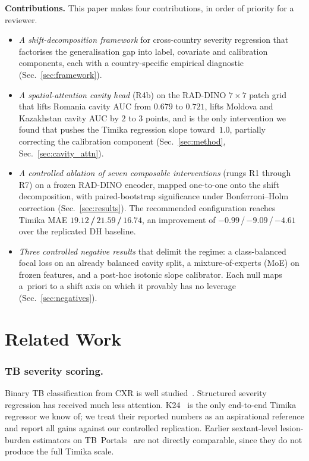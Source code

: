 \documentclass[runningheads]{llncs}
\begin{document}
\smallskip\noindent\textbf{Contributions.}
This paper makes four contributions, in order of priority for a reviewer.
\begin{itemize}
\item \emph{A shift-decomposition framework} for cross-country severity regression that factorises the generalisation gap into label, covariate and calibration components, each with a country-specific empirical diagnostic (Sec.~\ref{sec:framework}).
\item \emph{A spatial-attention cavity head} (R4b) on the RAD-DINO $7\!\times\!7$ patch grid that lifts Romania cavity AUC from $0.679$ to $0.721$, lifts Moldova and Kazakhstan cavity AUC by $2$ to $3$ points, and is the only intervention we found that pushes the Timika regression slope toward~$1.0$, partially correcting the calibration component (Sec.~\ref{sec:method}, Sec.~\ref{sec:cavity_attn}).
\item \emph{A controlled ablation of seven composable interventions} (rungs R1 through R7) on a frozen RAD-DINO encoder, mapped one-to-one onto the shift decomposition, with paired-bootstrap significance under Bonferroni--Holm correction (Sec.~\ref{sec:results}). The recommended configuration reaches Timika MAE \textbf{$19.12$\,/\,$21.59$\,/\,$16.74$}, an improvement of $-0.99$\,/\,$-9.09$\,/\,$-4.61$ over the replicated DH baseline.
\item \emph{Three controlled negative results} that delimit the regime: a class-balanced focal loss on an already balanced cavity split, a mixture-of-experts (MoE) on frozen features, and a post-hoc isotonic slope calibrator. Each null maps a~priori to a shift axis on which it provably has no leverage (Sec.~\ref{sec:negatives}).
\end{itemize}

\section{Related Work}

\subsubsection{TB severity scoring.}
Binary TB classification from CXR is well studied~\cite{liu2020tbx11k,jaeger2014shenzhen}. Structured severity regression has received much less attention. K24~\cite{kantipudi2024} is the only end-to-end Timika regressor we know of; we treat their reported numbers as an aspirational reference and report all gains against our controlled replication. Earlier sextant-level lesion-burden estimators on TB~Portals~\cite{tbportals2020} are not directly comparable, since they do not produce the full Timika scale.
\end{document}
